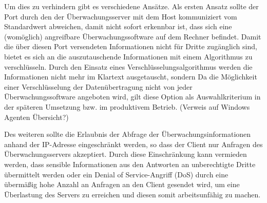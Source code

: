 Um dies zu verhindern gibt es verschiedene Ansätze.
Als ersten Ansatz sollte der Port durch den der Überwachungsserver mit dem Host kommuniziert vom Standardwert abweichen, damit nicht sofort erkennbar ist, dass sich eine (womöglich) angreifbare Überwachungssoftware auf dem Rechner befindet.\label{changeport}
Damit die über diesen Port versendeten Informationen nicht für Dritte zugänglich sind, bietet es sich an die auszutauschende Informationen mit einem Algorithmus zu verschlüsseln.
Durch den Einsatz eines Verschlüsselungsalgorithmus werden die Informationen nicht mehr im Klartext ausgetauscht, sondern
Da die Möglichkeit einer Verschlüsselung der Datenübertragung nicht von jeder Überwachungssoftware angeboten wird, gilt diese Option als Auswahlkriterium in der späteren Umsetzung bzw. im produktivem Betrieb. (Verweis auf Windows Agenten Übersicht?)

Des weiteren sollte die Erlaubnis der Abfrage der Überwachungsinformationen anhand der \gls{IP}-Adresse eingeschränkt werden, so dass der Client nur Anfragen des Überwachungsservers akzeptiert.
Durch diese Einschränkung kann vermieden werden, dass sensible Informationen aus den Antworten an unberechtigte Dritte übermittelt werden oder ein Denial of Service-Angriff (\gls{DoS}) durch eine übermäßig hohe Anzahl an Anfragen an den Client gesendet wird, um eine Überlastung des Servers zu erreichen und diesen somit arbeitsunfähig zu machen.





























